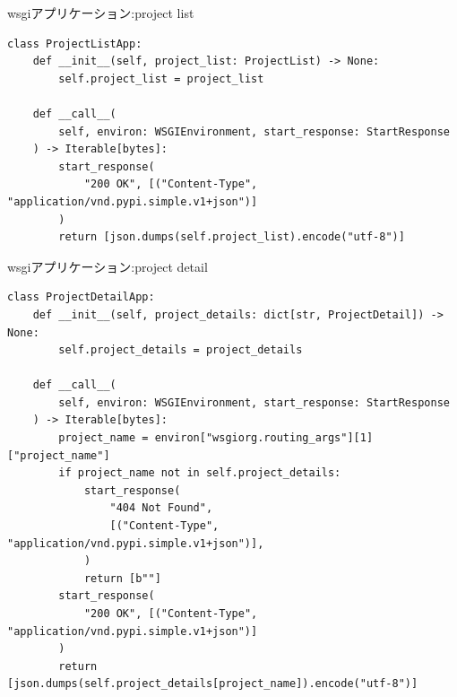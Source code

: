 \documentclass[presentation]{beamer}
\begin{document}
\begin{frame}[label={sec:orgbb8961a},fragile]{wsgiアプリケーション:project list}
 \begin{verbatim}
class ProjectListApp:
    def __init__(self, project_list: ProjectList) -> None:
        self.project_list = project_list

    def __call__(
        self, environ: WSGIEnvironment, start_response: StartResponse
    ) -> Iterable[bytes]:
        start_response(
            "200 OK", [("Content-Type", "application/vnd.pypi.simple.v1+json")]
        )
        return [json.dumps(self.project_list).encode("utf-8")]

\end{verbatim}
\end{frame}
\begin{frame}[label={sec:orgfd5cb74},fragile]{wsgiアプリケーション:project detail}
 \begin{verbatim}
class ProjectDetailApp:
    def __init__(self, project_details: dict[str, ProjectDetail]) -> None:
        self.project_details = project_details

    def __call__(
        self, environ: WSGIEnvironment, start_response: StartResponse
    ) -> Iterable[bytes]:
        project_name = environ["wsgiorg.routing_args"][1]["project_name"]
        if project_name not in self.project_details:
            start_response(
                "404 Not Found",
                [("Content-Type", "application/vnd.pypi.simple.v1+json")],
            )
            return [b""]
        start_response(
            "200 OK", [("Content-Type", "application/vnd.pypi.simple.v1+json")]
        )
        return [json.dumps(self.project_details[project_name]).encode("utf-8")]

\end{verbatim}
\end{frame}
\end{document}
